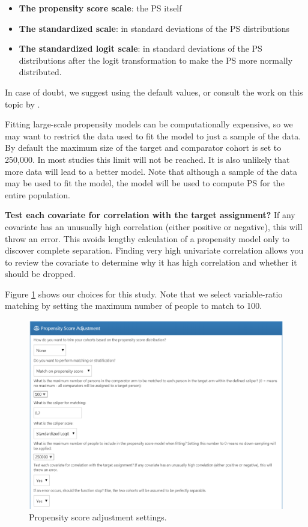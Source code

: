 \documentclass[]{book}
\providecommand{\tightlist}{%
  \setlength{\itemsep}{0pt}\setlength{\parskip}{0pt}}
\begin{document}
\begin{itemize}
\tightlist
\item
  \textbf{The propensity score scale}: the PS itself
\item
  \textbf{The standardized scale}: in standard deviations of the PS distributions
\item
  \textbf{The standardized logit scale}: in standard deviations of the PS distributions after the logit transformation to make the PS more normally distributed.
\end{itemize}

In case of doubt, we suggest using the default values, or consult the work on this topic by \citet{austin_2011}.

Fitting large-scale propensity models can be computationally expensive, so we may want to restrict the data used to fit the model to just a sample of the data. By default the maximum size of the target and comparator cohort is set to 250,000. In most studies this limit will not be reached. It is also unlikely that more data will lead to a better model. Note that although a sample of the data may be used to fit the model, the model will be used to compute PS for the entire population.

\textbf{Test each covariate for correlation with the target assignment?} If any covariate has an unusually high correlation (either positive or negative), this will throw an error. This avoids lengthy calculation of a propensity model only to discover complete separation. Finding very high univariate correlation allows you to review the covariate to determine why it has high correlation and whether it should be dropped.

Figure \ref{fig:psSettings} shows our choices for this study. Note that we select variable-ratio matching by setting the maximum number of people to match to 100.

\begin{figure}

{\centering \includegraphics[width=1\linewidth]{images/PopulationLevelEstimation/psSettings} 

}

\caption{Propensity score adjustment settings.}\label{fig:psSettings}
\end{figure}
\end{document}
